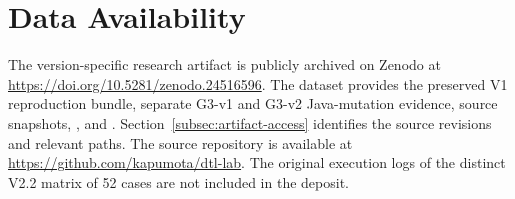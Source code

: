 \documentclass[preprint,12pt]{elsarticle}
\begin{document}




















\section*{Data Availability}
The version-specific research artifact is publicly archived on Zenodo at
\url{https://doi.org/10.5281/zenodo.24516596}. The dataset provides the
preserved V1 reproduction bundle, separate G3-v1 and G3-v2 Java-mutation
evidence, source snapshots, , and
. Section~\ref{subsec:artifact-access} identifies the
source revisions and relevant paths. The source repository is available at
\url{https://github.com/kapumota/dtl-lab}. The original execution logs of
the distinct V2.2 matrix of 52 cases are not included in the deposit.


\small
\let\path\nolinkurl

\end{document}
